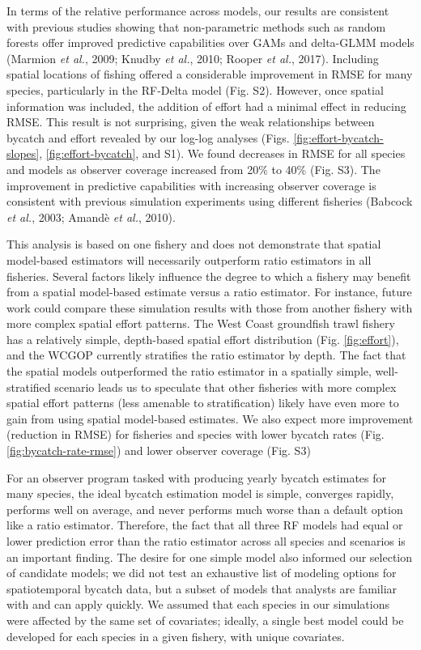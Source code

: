 \documentclass[]{article}
\begin{document}
In terms of the relative performance across models, our results are
consistent with previous studies showing that non-parametric methods
such as random forests offer improved predictive capabilities over GAMs
and delta-GLMM models (Marmion \emph{et al.}, 2009; Knudby \emph{et
al.}, 2010; Rooper \emph{et al.}, 2017). Including spatial locations of
fishing offered a considerable improvement in RMSE for many species,
particularly in the RF-Delta model (Fig. S2). However, once spatial
information was included, the addition of effort had a minimal effect in
reducing RMSE. This result is not surprising, given the weak
relationships between bycatch and effort revealed by our log-log
analyses (Figs. \ref{fig:effort-bycatch-slopes},
\ref{fig:effort-bycatch}, and S1). We found decreases in RMSE for all
species and models as observer coverage increased from 20\% to 40\%
(Fig. S3). The improvement in predictive capabilities with increasing
observer coverage is consistent with previous simulation experiments
using different fisheries (Babcock \emph{et al.}, 2003; Amandè \emph{et
al.}, 2010).

This analysis is based on one fishery and does not demonstrate that
spatial model-based estimators will necessarily outperform ratio
estimators in all fisheries. Several factors likely influence the degree
to which a fishery may benefit from a spatial model-based estimate
versus a ratio estimator. For instance, future work could compare these
simulation results with those from another fishery with more complex
spatial effort patterns. The West Coast groundfish trawl fishery has a
relatively simple, depth-based spatial effort distribution (Fig.
\ref{fig:effort}), and the WCGOP currently stratifies the ratio
estimator by depth. The fact that the spatial models outperformed the
ratio estimator in a spatially simple, well-stratified scenario leads us
to speculate that other fisheries with more complex spatial effort
patterns (less amenable to stratification) likely have even more to gain
from using spatial model-based estimates. We also expect more
improvement (reduction in RMSE) for fisheries and species with lower
bycatch rates (Fig. \ref{fig:bycatch-rate-rmse}) and lower observer
coverage (Fig. S3)

For an observer program tasked with producing yearly bycatch estimates
for many species, the ideal bycatch estimation model is simple,
converges rapidly, performs well on average, and never performs much
worse than a default option like a ratio estimator. Therefore, the fact
that all three RF models had equal or lower prediction error than the
ratio estimator across all species and scenarios is an important
finding. The desire for one simple model also informed our selection of
candidate models; we did not test an exhaustive list of modeling options
for spatiotemporal bycatch data, but a subset of models that analysts
are familiar with and can apply quickly. We assumed that each species in
our simulations were affected by the same set of covariates; ideally, a
single best model could be developed for each species in a given
fishery, with unique covariates.
\end{document}
